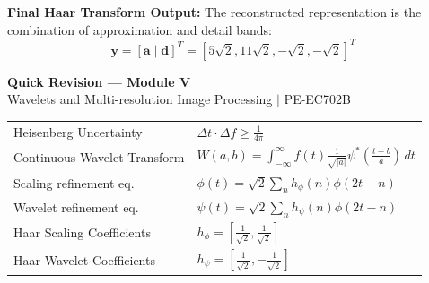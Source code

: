 \documentclass[12pt,a4paper]{article}
\renewcommand{\arraystretch}{1.45}
\begin{document}
\begin{tcolorbox}[examplebox, title={1D Haar Wavelet Transform}]
\par\noindent\textbf{Final Haar Transform Output:}
The reconstructed representation is the combination of approximation and detail bands:
\begin{equation*}
  \mathbf{y} = [\mathbf{a} \mid \mathbf{d}]^T = [5\sqrt{2}, 11\sqrt{2}, -\sqrt{2}, -\sqrt{2}]^T
\end{equation*}
\end{tcolorbox}

\newpage

\begin{center}
  {\large\bfseries\color{myred} Quick Revision --- Module V}\\[3pt]
  {\small\color{mydark} Wavelets and Multi-resolution Image Processing $|$ PE-EC702B}
\end{center}
\noindent{\color{myred}\rule{\linewidth}{1.2pt}}
\vspace{4pt}

\begin{tcolorbox}[formulabox, title={\textbf{Key Formulas at a Glance}}]
\renewcommand{\arraystretch}{1.3}
\begin{tabularx}{\linewidth}{B{5.0cm} X}Heisenberg Uncertainty & $\Delta t \cdot \Delta f \ge \frac{1}{4\pi}$ \\
Continuous Wavelet Transform & $W(a,b) = \int_{-\infty}^{\infty} f(t) \frac{1}{\sqrt{|a|}} \psi^*\left(\frac{t-b}{a}\right) \, dt$ \\
Scaling refinement eq. & $\phi(t) = \sqrt{2} \sum_n h_\phi(n) \phi(2t-n)$ \\
Wavelet refinement eq. & $\psi(t) = \sqrt{2} \sum_n h_\psi(n) \phi(2t-n)$ \\
Haar Scaling Coefficients & $h_\phi = \left[ \frac{1}{\sqrt{2}}, \frac{1}{\sqrt{2}} \right]$ \\
Haar Wavelet Coefficients & $h_\psi = \left[ \frac{1}{\sqrt{2}}, -\frac{1}{\sqrt{2}} \right]$
\end{tabularx}
\end{tcolorbox}
\end{document}
